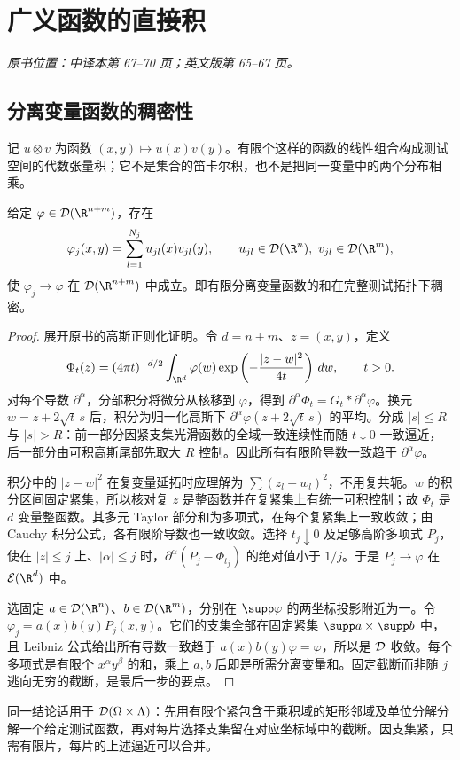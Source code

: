 \section{广义函数的直接积}\label{sec:yosida-01-14}
\noindent\textit{原书位置：中译本第 67--70 页；英文版第 65--67 页。}

\subsection{分离变量函数的稠密性}
记 $u\otimes v$ 为函数 $(x,y)\mapsto u(x)v(y)$。有限个这样的函数的线性组合构成测试空间的代数张量积；它不是集合的笛卡尔积，也不是把同一变量中的两个分布相乘。

\begin{theorem}[分离变量的测试函数逼近]\label{thm:y1-tensor-density}
给定 $\varphi\in\Test(\R^{n+m})$，存在
\[
 \varphi_j(x,y)=\sum_{l=1}^{N_j}u_{jl}(x)v_{jl}(y),\qquad
 u_{jl}\in\Test(\R^n),\ v_{jl}\in\Test(\R^m),
\]
使 $\varphi_j\to\varphi$ 在 $\Test(\R^{n+m})$ 中成立。即有限分离变量函数的和在完整测试拓扑下稠密。
\end{theorem}
\begin{proof}
展开原书的高斯正则化证明。令 $d=n+m$、$z=(x,y)$，定义
\[
 \Phi_t(z)=(4\pi t)^{-d/2}\int_{\R^d}
 \varphi(w)\exp\left(-\frac{|z-w|^2}{4t}\right)\,dw,
 \qquad t>0.
\]
对每个导数 $\partial^\alpha$，分部积分将微分从核移到 $\varphi$，得到 $\partial^\alpha\Phi_t=G_t*\partial^\alpha\varphi$。换元 $w=z+2\sqrt t\,s$ 后，积分为归一化高斯下 $\partial^\alpha\varphi(z+2\sqrt t\,s)$ 的平均。分成 $|s|\le R$ 与 $|s|>R$：前一部分因紧支集光滑函数的全域一致连续性而随 $t\downarrow0$ 一致逼近，后一部分由可积高斯尾部先取大 $R$ 控制。因此所有有限阶导数一致趋于 $\partial^\alpha\varphi$。

积分中的 $|z-w|^2$ 在复变量延拓时应理解为 $\sum(z_l-w_l)^2$，不用复共轭。$w$ 的积分区间固定紧集，所以核对复 $z$ 是整函数并在复紧集上有统一可积控制；故 $\Phi_t$ 是 $d$ 变量整函数。其多元 Taylor 部分和为多项式，在每个复紧集上一致收敛；由 Cauchy 积分公式，各有限阶导数也一致收敛。选择 $t_j\downarrow0$ 及足够高阶多项式 $P_j$，使在 $|z|\le j$ 上、$|\alpha|\le j$ 时，$\partial^\alpha(P_j-\Phi_{t_j})$ 的绝对值小于 $1/j$。于是 $P_j\to\varphi$ 在 $\mathcal E(\R^d)$ 中。

选固定 $a\in\Test(\R^n)$、$b\in\Test(\R^m)$，分别在 $\supp\varphi$ 的两坐标投影附近为一。令 $\varphi_j=a(x)b(y)P_j(x,y)$。它们的支集全部在固定紧集 $\supp a\times\supp b$ 中，且 Leibniz 公式给出所有导数一致趋于 $a(x)b(y)\varphi=\varphi$，所以是 $\mathcal{D}$ 收敛。每个多项式是有限个 $x^\alpha y^\beta$ 的和，乘上 $a,b$ 后即是所需分离变量和。固定截断而非随 $j$ 逃向无穷的截断，是最后一步的要点。
\end{proof}
同一结论适用于 $\mathcal{D}(\Omega\times\Lambda)$：先用有限个紧包含于乘积域的矩形邻域及单位分解分解一个给定测试函数，再对每片选择支集留在对应坐标域中的截断。因支集紧，只需有限片，每片的上述逼近可以合并。

